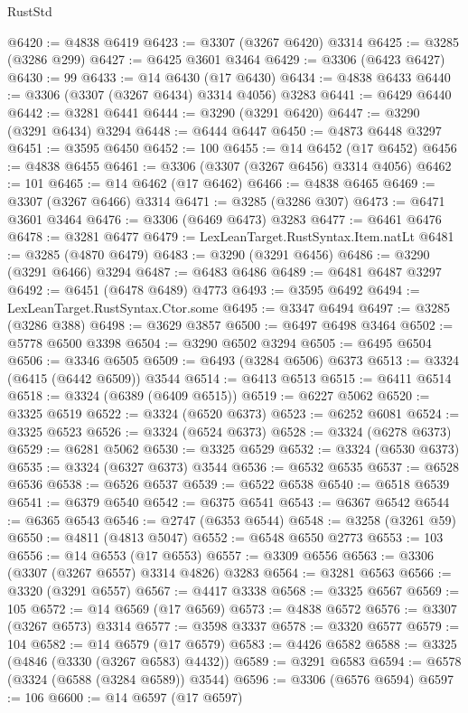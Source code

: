 \begin{lexlean}{RustStd}
\begin{coremodule}
@6420 := @4838 @6419
@6423 := @3307 (@3267 @6420) @3314
@6425 := @3285 (@3286 @299)
@6427 := @6425 @3601 @3464
@6429 := @3306 (@6423 @6427)
@6430 := 99
@6433 := @14 @6430 (@17 @6430)
@6434 := @4838 @6433
@6440 := @3306 (@3307 (@3267 @6434) @3314 @4056) @3283
@6441 := @6429 @6440
@6442 := @3281 @6441
@6444 := @3290 (@3291 @6420)
@6447 := @3290 (@3291 @6434) @3294
@6448 := @6444 @6447
@6450 := @4873 @6448 @3297
@6451 := @3595 @6450
@6452 := 100
@6455 := @14 @6452 (@17 @6452)
@6456 := @4838 @6455
@6461 := @3306 (@3307 (@3267 @6456) @3314 @4056)
@6462 := 101
@6465 := @14 @6462 (@17 @6462)
@6466 := @4838 @6465
@6469 := @3307 (@3267 @6466) @3314
@6471 := @3285 (@3286 @307)
@6473 := @6471 @3601 @3464
@6476 := @3306 (@6469 @6473) @3283
@6477 := @6461 @6476
@6478 := @3281 @6477
@6479 := LexLeanTarget.RustSyntax.Item.natLt
@6481 := @3285 (@4870 @6479)
@6483 := @3290 (@3291 @6456)
@6486 := @3290 (@3291 @6466) @3294
@6487 := @6483 @6486
@6489 := @6481 @6487 @3297
@6492 := @6451 (@6478 @6489) @4773
@6493 := @3595 @6492
@6494 := LexLeanTarget.RustSyntax.Ctor.some
@6495 := @3347 @6494
@6497 := @3285 (@3286 @388)
@6498 := @3629 @3857
@6500 := @6497 @6498 @3464
@6502 := @5778 @6500 @3398
@6504 := @3290 @6502 @3294
@6505 := @6495 @6504
@6506 := @3346 @6505
@6509 := @6493 (@3284 @6506) @6373
@6513 := @3324 (@6415 (@6442 @6509)) @3544
@6514 := @6413 @6513
@6515 := @6411 @6514
@6518 := @3324 (@6389 (@6409 @6515))
@6519 := @6227 @5062
@6520 := @3325 @6519
@6522 := @3324 (@6520 @6373)
@6523 := @6252 @6081
@6524 := @3325 @6523
@6526 := @3324 (@6524 @6373)
@6528 := @3324 (@6278 @6373)
@6529 := @6281 @5062
@6530 := @3325 @6529
@6532 := @3324 (@6530 @6373)
@6535 := @3324 (@6327 @6373) @3544
@6536 := @6532 @6535
@6537 := @6528 @6536
@6538 := @6526 @6537
@6539 := @6522 @6538
@6540 := @6518 @6539
@6541 := @6379 @6540
@6542 := @6375 @6541
@6543 := @6367 @6542
@6544 := @6365 @6543
@6546 := @2747 (@6353 @6544)
@6548 := @3258 (@3261 @59)
@6550 := @4811 (@4813 @5047)
@6552 := @6548 @6550 @2773
@6553 := 103
@6556 := @14 @6553 (@17 @6553)
@6557 := @3309 @6556
@6563 := @3306 (@3307 (@3267 @6557) @3314 @4826) @3283
@6564 := @3281 @6563
@6566 := @3320 (@3291 @6557)
@6567 := @4417 @3338
@6568 := @3325 @6567
@6569 := 105
@6572 := @14 @6569 (@17 @6569)
@6573 := @4838 @6572
@6576 := @3307 (@3267 @6573) @3314
@6577 := @3598 @3337
@6578 := @3320 @6577
@6579 := 104
@6582 := @14 @6579 (@17 @6579)
@6583 := @4426 @6582
@6588 := @3325 (@4846 (@3330 (@3267 @6583) @4432))
@6589 := @3291 @6583
@6594 := @6578 (@3324 (@6588 (@3284 @6589)) @3544)
@6596 := @3306 (@6576 @6594)
@6597 := 106
@6600 := @14 @6597 (@17 @6597)

\end{coremodule}
\end{lexlean}
